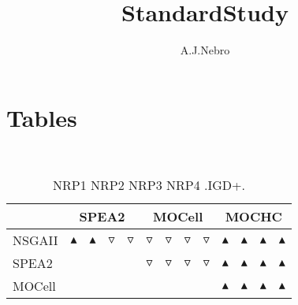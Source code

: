 \documentclass{article}
\title{StandardStudy}
\author{A.J.Nebro}
\begin{document}
\maketitle
\section{Tables}
\
\begin{table}
\caption{
NRP1 NRP2 NRP3 NRP4 
.IGD+.}
\label{Table:
NRP1 NRP2 NRP3 NRP4 
.IGD+.}
\centering
\begin{scriptsize}
\begin{tabular}{
| l | p{0.15cm }p{0.15cm }p{0.15cm }p{0.15cm } | p{0.15cm }p{0.15cm }p{0.15cm }p{0.15cm } | p{0.15cm }p{0.15cm }p{0.15cm }p{0.15cm } | 
}
\hline \multicolumn{1}{|c|}{} & \multicolumn{4}{c|}{SPEA2} & \multicolumn{4}{c|}{MOCell} & \multicolumn{4}{c|}{MOCHC} \\
\hline 
NSGAII
 & 
$\blacktriangle$
&
$\blacktriangle$
&
$\triangledown$
&
$\triangledown$
 & 
$\triangledown$
&
$\triangledown$
&
$\triangledown$
&
$\triangledown$
 & 
$\blacktriangle$
&
$\blacktriangle$
&
$\blacktriangle$
&
$\blacktriangle$
 \\ 
SPEA2
 & 
  
&
  
&
  
&
  
 & 
$\triangledown$
&
$\triangledown$
&
$\triangledown$
&
$\triangledown$
 & 
$\blacktriangle$
&
$\blacktriangle$
&
$\blacktriangle$
&
$\blacktriangle$
 \\ 
MOCell
 & 
 
&
 
&
 
&
 
 & 
  
&
  
&
  
&
  
 & 
$\blacktriangle$
&
$\blacktriangle$
&
$\blacktriangle$
&
$\blacktriangle$
 \\ 
\hline
\end{tabular}
\end{scriptsize}
\end{table}
\end{document}
